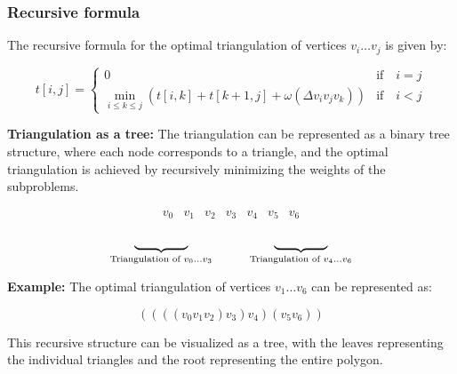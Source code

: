 \subsubsection{Recursive formula}
\begin{definition}
    The recursive formula for the optimal triangulation of vertices \(v_i \dots v_j\) is given by:
    
    \begin{equation}
    t[i, j] = 
    \begin{cases}
    0 & \text{if} \quad i = j \\
    \min_{i \leq k \leq j} \left( t[i, k] + t[k+1, j] + \omega(\Delta v_i v_j v_k) \right) & \text{if} \quad i < j
    \end{cases}
    \end{equation}
\end{definition}

\textbf{Triangulation as a tree:} The triangulation can be represented as a binary tree structure, where each node corresponds to a triangle, and the optimal triangulation is achieved by recursively minimizing the weights of the subproblems.
    
\[
\begin{array}{ccccccccc}
v_0 & v_1 & v_2 & v_3 & v_4 & v_5 & v_6 \\
\end{array}
\]
\[
\begin{array}{c}
\underbrace{\hspace{1.5cm}}_{\text{Triangulation of } v_0 \dots v_3} \hspace{1cm} \underbrace{\hspace{1.5cm}}_{\text{Triangulation of } v_4 \dots v_6}
\end{array}
\]
    
    \textbf{Example:} The optimal triangulation of vertices \(v_1 \dots v_6\) can be represented as:
    
    \[
    ((((v_0 v_1 v_2) v_3) v_4) (v_5 v_6))
    \]
    
    This recursive structure can be visualized as a tree, with the leaves representing the individual triangles and the root representing the entire polygon.

